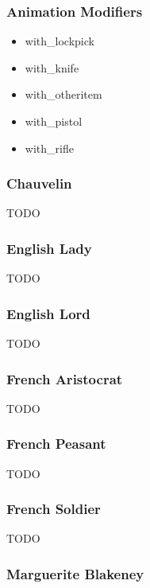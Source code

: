 \subsubsection{Animation Modifiers}

\begin{itemize}

\item with\_lockpick
\item with\_knife
\item with\_otheritem
\item with\_pistol
\item with\_rifle

\end{itemize}

\subsubsection{Chauvelin}

TODO

\subsubsection{English Lady}

TODO

\subsubsection{English Lord}

TODO

\subsubsection{French Aristocrat}

TODO

\subsubsection{French Peasant}

TODO

\subsubsection{French Soldier}

TODO

\subsubsection{Marguerite Blakeney}


